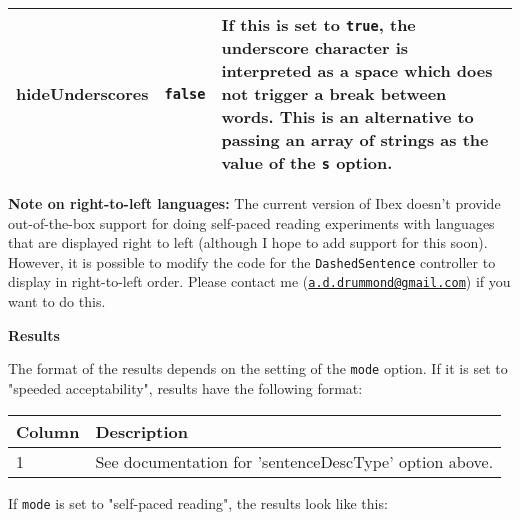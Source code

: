 \documentclass[
]{article}
\begin{document}
\begin{RaggedRight}
\begin{longtable}[]{p{1.7in}p{1in}p{3.15in}}
\begin{minipage}[t]{0.15\columnwidth}
hideUnderscores\strut
\end{minipage} & \begin{minipage}[t]{0.22\columnwidth}\raggedright
\texttt{false}\strut
\end{minipage} & \begin{minipage}[t]{0.54\columnwidth}\raggedright
If this is set to \texttt{true}, the underscore character is interpreted
as a space which does not trigger a break between words. This is an
alternative to passing an array of strings as the value of the
\texttt{s} option.\strut
\end{minipage}\tabularnewline
\bottomrule
\end{longtable}\normalsize\end{RaggedRight}

\textbf{Note on right-to-left languages:} The current version of Ibex
doesn't provide out-of-the-box support for doing self-paced reading
experiments with languages that are displayed right to left (although I
hope to add support for this soon). However, it is possible to modify
the code for the \texttt{DashedSentence} controller to display in
right-to-left order. Please contact me
(\href{mailto:a.d.drummond@gmail.com}{\nolinkurl{a.d.drummond@gmail.com}})
if you want to do this.

\textbf{Results}

The format of the results depends on the setting of the \texttt{mode}
option. If it is set to "speeded acceptability", results have the
following format:

\begin{RaggedRight}\small\begin{longtable}[]{p{1.7in}p{4.3in}}
\toprule
\textbf{Column} & \textbf{Description}\tabularnewline
\midrule
\endhead
1 & See documentation for 'sentenceDescType' option
above.\tabularnewline
\bottomrule
\end{longtable}\normalsize\end{RaggedRight}

If \texttt{mode} is set to "self-paced reading", the results look like
this:
\end{document}
